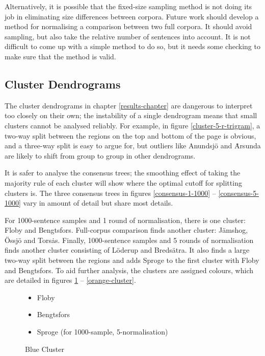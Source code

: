 Alternatively, it is possible that the fixed-size sampling method is not doing its
job in eliminating size differences between corpora. Future work
should develop a method for normalising a comparison between two full
corpora. It should avoid sampling, but also take the relative number
of sentences into account. It is not difficult to come up
with a simple method to do so, but it needs some checking to make sure
that the method is valid.

\subsection{Cluster Dendrograms}

The cluster dendrograms in chapter \ref{results-chapter} are dangerous
to interpret too closely on their own; the instability of a single
dendrogram means that small clusters cannot be analysed reliably. For
example, in figure \ref{cluster-5-r-trigram}, a two-way split
between the regions on the top and bottom of the page is
obvious, and a three-way split is easy to argue for, but outliers like
Anundsj\"o and \.Arsunda are likely to shift from group to group in
other dendrograms.

It is safer to analyse the consensus trees; the smoothing effect of
taking the majority rule of each cluster will show where the optimal
cutoff for splitting clusters is. The three consensus trees in figures
\ref{consensus-1-1000} -- \ref{consensus-5-1000} vary in amount of
detail but share most details.

For 1000-sentence samples and 1 round of normalisation, there is one
cluster: Floby and Bengtsfors. Full-corpus comparison finds
another cluster: J\"amshog, \"Ossj\"o and Tors\.as. Finally,
1000-sentence samples and 5 rounds of normalisation finds another
cluster consisting of L\"oderup and Breds\"atra. It also finds
a large two-way split between the regions and adds Sproge to the first
cluster with Floby and Bengtsfors. To aid further analysis, the
clusters are assigned colours, which are detailed in figures
\ref{blue-cluster} -- \ref{orange-cluster}. 

\begin{figure}
\begin{itemize}
\item Floby
\item Bengtsfors
\item Sproge (for 1000-sample, 5-normalisation)
\end{itemize}
\caption{Blue Cluster}
\label{blue-cluster}
\end{figure}

